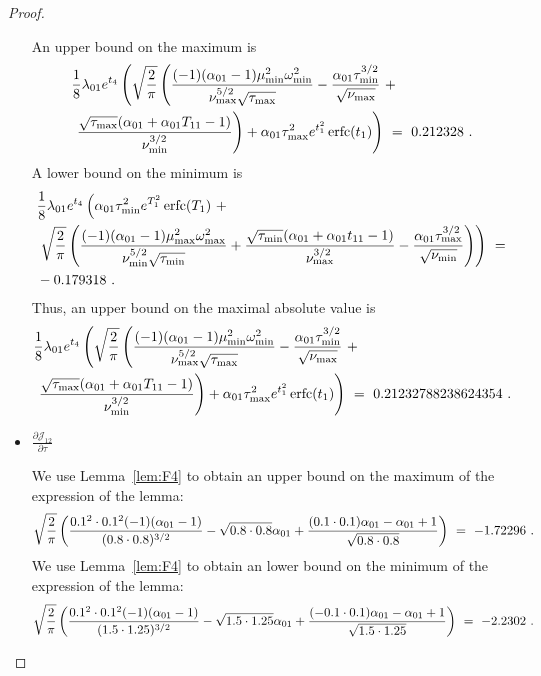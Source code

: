 \documentclass{article}
\DeclareMathOperator{\erfc}{erfc}
\begin{document}
\begin{proof}
\begin{itemize}
An upper bound on the maximum is
\begin{align}
&\frac{1}{8} \lambda_{\rm 01} e^{t_4}
  \left(\sqrt{\frac{2}{\pi }} \left(\frac{(-1) (\alpha_{\rm 01}-1)
  \mu_{\rm min}^2 \omega_{\rm min}^2}{\nu_{\rm max}^{5/2}
  \sqrt{\tau_{\rm max}}}-\frac{\alpha_{\rm 01}
  \tau_{\rm min}^{3/2}}{\sqrt{\nu_{\rm max}}}\ + \right. \right. \\
  \nonumber &\left. \left.  \frac{\sqrt{\tau_{\rm max}}
  (\alpha_{\rm 01}+\alpha_{\rm 01}
  T_{11}-1)}{\nu_{\rm min}^{3/2}}\right)+\alpha_{\rm 01}
  \tau_{\rm max}^2 e^{t_1^2} \erfc (t_1)\right)
  \ = \ 
0.212328\ .
\end{align}
A lower bound on the minimum is
\begin{align}
&\frac{1}{8} \lambda_{\rm 01} e^{t_4} \left(\alpha_{\rm 01} \tau_{\rm min}^2 e^{T_1^2}
  \erfc (T_1)\ + \right.  \\
  \nonumber &\left. \sqrt{\frac{2}{\pi }} \left(\frac{(-1)
  (\alpha_{\rm 01}-1) \mu_{\rm max}^2
  \omega_{\rm max}^2}{\nu_{\rm min}^{5/2}
  \sqrt{\tau_{\rm min}}}+\frac{\sqrt{\tau_{\rm min}} (\alpha_{\rm 01}+\alpha_{\rm 01}
  t_{11}-1)}{\nu_{\rm max}^{3/2}}-\frac{\alpha_{\rm 01}
  \tau_{\rm max}^{3/2}}{\sqrt{\nu_{\rm min}}}\right)\right) \ = \\ \nonumber 
& -0.179318\ .
\end{align}
Thus, an upper bound on the maximal absolute value is 
\begin{align}
&\frac{1}{8} \lambda_{\rm 01} e^{t_4}
  \left(\sqrt{\frac{2}{\pi }} \left(\frac{(-1) (\alpha_{\rm 01}-1)
  \mu_{\rm min}^2 \omega_{\rm min}^2}{\nu_{\rm max}^{5/2}
  \sqrt{\tau_{\rm max}}}-\frac{\alpha_{\rm 01}
  \tau_{\rm min}^{3/2}}{\sqrt{\nu_{\rm max}}}\ + \right. \right. \\
  \nonumber &\left. \left.  \frac{\sqrt{\tau_{\rm max}}
  (\alpha_{\rm 01}+\alpha_{\rm 01}
  T_{11}-1)}{\nu_{\rm min}^{3/2}}\right)+\alpha_{\rm 01}
  \tau_{\rm max}^2 e^{t_1^2} \erfc (t_1)\right)
  \ = \ 0.21232788238624354 \ .
\end{align}

\item $\frac{\partial {\mathcal J}_{12}}{\partial \tau}$

We use Lemma~\ref{lem:F4} to obtain
an upper bound on the maximum of the expression of the lemma:
\begin{align}
\sqrt{\frac{2}{\pi }} \left(\frac{0.1^2 \cdot 0.1^2 (-1) (\alpha_{\rm 01}-1)}{(0.8 \cdot 0.8)^{3/2}}-\sqrt{0.8 \cdot 0.8} \alpha_{\rm 01}+
 \frac{(0.1 \cdot 0.1) \alpha_{\rm 01}-\alpha_{\rm 01}+1}{\sqrt{0.8 \cdot 0.8}}\right) \ = \
-1.72296 \ .
\end{align}
We use Lemma~\ref{lem:F4} to obtain
an lower bound on the minimum of the expression of the lemma:
\begin{align}
\sqrt{\frac{2}{\pi }} \left(\frac{0.1^2 \cdot 0.1^2 (-1) (\alpha_{\rm 01}-1)}{(1.5 \cdot 1.25)^{3/2}}-
 \sqrt{1.5 \cdot 1.25} \alpha_{\rm 01}+\frac{(-0.1 \cdot 0.1) \alpha_{\rm 01}-
 \alpha_{\rm 01}+1}{\sqrt{1.5 \cdot 1.25}}\right) \ = \ 
-2.2302 \ .
\end{align}



\end{itemize}
\end{proof}
\end{document}
